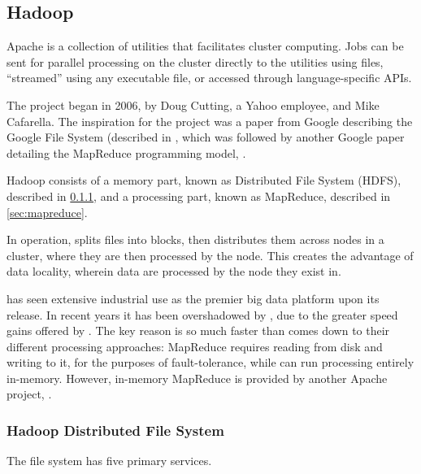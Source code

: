 \subsection{Hadoop}\label{sec:hadoop-1}

Apache  is a collection of utilities that facilitates cluster computing.
Jobs can be sent for parallel processing on the cluster directly to the utilities using  files, ``streamed'' using any executable file, or accessed through language-specific APIs.

The project began in 2006, by Doug Cutting, a Yahoo employee, and Mike Cafarella.
The inspiration for the project was a paper from Google describing the Google File System (described in \textcite{ghemawat2003google}, which was followed by another Google paper detailing the MapReduce programming model, \textcite{dean2004mapreduce}.

Hadoop consists of a memory part, known as  Distributed File System (HDFS), described in \cref{sec:hdfs}, and a processing part, known as MapReduce, described in \cref{sec:mapreduce}.

In operation,  splits files into blocks, then distributes them across nodes in a cluster, where they are then processed by the node.
This creates the advantage of data locality, wherein data are processed by the node they exist in.

 has seen extensive industrial use as the premier big data
platform upon its release.
In recent years it has been overshadowed by , due to the greater speed gains offered by .
The key reason  is so much faster than  comes down to their different processing approaches:  MapReduce requires reading from disk and writing to it, for the purposes of fault-tolerance, while  can run processing entirely in-memory.
However, in-memory MapReduce is provided by another Apache project, \cite{zheludkov2017high}.

\subsubsection{Hadoop Distributed File System}\label{sec:hdfs}

The file system has five primary services.

